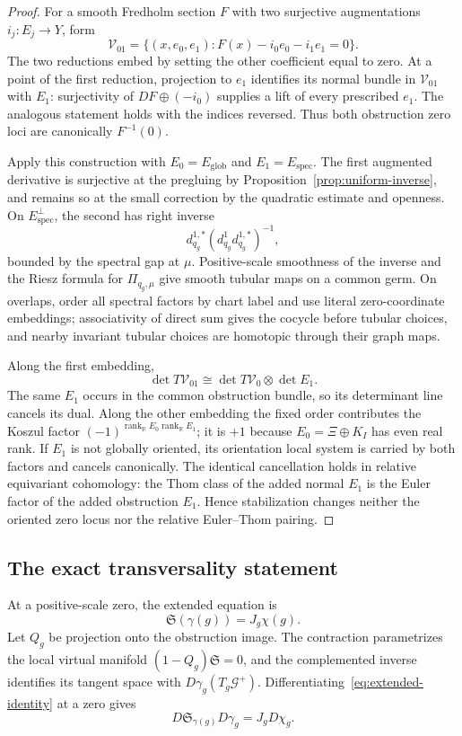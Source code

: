 \documentclass[11pt]{amsart}
\theoremstyle{definition}
\theoremstyle{remark}
\theoremstyle{plain}
\newcommand{\RR}{\mathbb{R}}
\newcommand{\cG}{\mathcal{G}}
\newcommand{\cV}{\mathcal{V}}
\newcommand{\rank}{\operatorname{rank}}
\begin{document}
\begin{proof}
For a smooth Fredholm section $F$ with two surjective augmentations
$i_j:E_j\to Y$, form
\[
 \cV_{01}=\{(x,e_0,e_1):F(x)-i_0e_0-i_1e_1=0\}.
\]
The two reductions embed by setting the other coefficient equal to zero.
At a point of the first reduction, projection to $e_1$ identifies its normal
bundle in $\cV_{01}$ with $E_1$: surjectivity of
$DF\oplus(-i_0)$ supplies a lift of every prescribed $e_1$.  The analogous
statement holds with the indices reversed.  Thus both obstruction zero loci
are canonically $F^{-1}(0)$.

Apply this construction with $E_0=E_{\mathrm{glob}}$ and
$E_1=E_{\mathrm{spec}}$.  The first augmented derivative is surjective
at the pregluing by Proposition~\ref{prop:uniform-inverse}, and remains
so at the small correction by the quadratic estimate and openness.
On $E_{\mathrm{spec}}^\perp$, the second
has right inverse
\[
 d_{q_g}^{1,*}(d_{q_g}^1d_{q_g}^{1,*})^{-1},
\]
bounded by the spectral gap at $\mu$.  Positive-scale smoothness of the
inverse and the Riesz formula for $\Pi_{q_g,\mu}$ give smooth tubular
maps on a common germ.  On overlaps,
order all spectral factors by chart label and use literal zero-coordinate
embeddings; associativity of direct sum gives the cocycle before tubular
choices, and nearby invariant tubular choices are homotopic through their
graph maps.

Along the first embedding,
\[
 \det T\cV_{01}\cong\det T\cV_0\otimes\det E_1.
\]
The same $E_1$ occurs in the common obstruction bundle, so its determinant
line cancels its dual.  Along the other embedding the fixed order contributes
the Koszul factor
$(-1)^{\rank_{\RR}E_0\rank_{\RR}E_1}$; it is $+1$ because
$E_0=\Xi\oplus K_I$ has even real rank.  If $E_1$ is not globally oriented,
its orientation local system is carried by both factors and cancels
canonically.  The identical cancellation holds in relative equivariant
cohomology: the Thom class of the added normal $E_1$ is the Euler factor of
the added obstruction $E_1$.  Hence stabilization changes neither the
oriented zero locus nor the relative Euler--Thom pairing.
\end{proof}

\subsection{The exact transversality statement}
At a positive-scale zero, the extended equation is
\begin{equation}\label{eq:extended-identity}
 \mathfrak S(\gamma(g))=J_g\chi(g).
\end{equation}
Let $Q_g$ be projection onto the obstruction image.  The contraction
parametrizes the local virtual manifold $(1-Q_g)\mathfrak S=0$, and the
complemented inverse identifies its tangent space with
$D\gamma_g(T_g\cG^+)$.  Differentiating~\eqref{eq:extended-identity} at a
zero gives
\begin{equation}\label{eq:differentiated-obstruction}
 D\mathfrak S_{\gamma(g)}D\gamma_g=J_gD\chi_g.
\end{equation}
\end{document}
